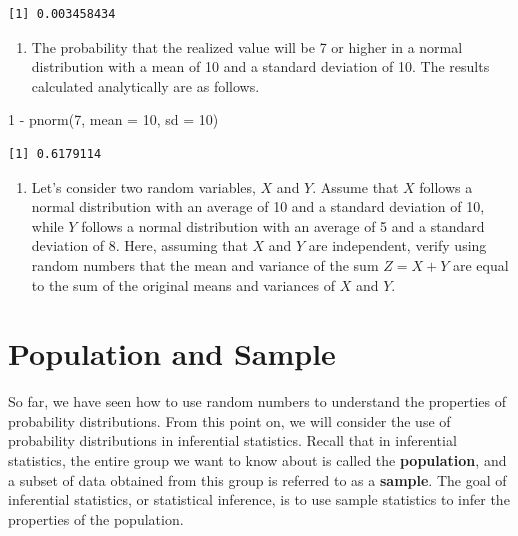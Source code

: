 \documentclass[
  a4paper,
]{book}
\newenvironment{Shaded}{\begin{snugshade}}{\end{snugshade}}
\newcommand{\AttributeTok}[1]{\textcolor[rgb]{0.40,0.45,0.13}{#1}}
\newcommand{\DecValTok}[1]{\textcolor[rgb]{0.68,0.00,0.00}{#1}}
\newcommand{\FunctionTok}[1]{\textcolor[rgb]{0.28,0.35,0.67}{#1}}
\newcommand{\NormalTok}[1]{\textcolor[rgb]{0.00,0.23,0.31}{#1}}
\newcommand{\SpecialCharTok}[1]{\textcolor[rgb]{0.37,0.37,0.37}{#1}}
\providecommand{\tightlist}{%
  \setlength{\itemsep}{0pt}\setlength{\parskip}{0pt}}\usepackage{longtable,booktabs,array}
\begin{document}
\begin{verbatim}
[1] 0.003458434
\end{verbatim}

\begin{enumerate}
\def\labelenumi{\arabic{enumi}.}
\setcounter{enumi}{3}
\tightlist
\item
  The probability that the realized value will be 7 or higher in a
  normal distribution with a mean of 10 and a standard deviation of 10.
  The results calculated analytically are as follows.
\end{enumerate}

\begin{Shaded}
\begin{Highlighting}[]
\DecValTok{1} \SpecialCharTok{{-}} \FunctionTok{pnorm}\NormalTok{(}\DecValTok{7}\NormalTok{, }\AttributeTok{mean =} \DecValTok{10}\NormalTok{, }\AttributeTok{sd =} \DecValTok{10}\NormalTok{)}
\end{Highlighting}
\end{Shaded}

\begin{verbatim}
[1] 0.6179114
\end{verbatim}

\begin{enumerate}
\def\labelenumi{\arabic{enumi}.}
\setcounter{enumi}{4}
\tightlist
\item
  Let's consider two random variables, \(X\) and \(Y\). Assume that
  \(X\) follows a normal distribution with an average of 10 and a
  standard deviation of 10, while \(Y\) follows a normal distribution
  with an average of 5 and a standard deviation of 8. Here, assuming
  that \(X\) and \(Y\) are independent, verify using random numbers that
  the mean and variance of the sum \(Z=X+Y\) are equal to the sum of the
  original means and variances of \(X\) and \(Y\).
\end{enumerate}

\section{Population and Sample}\label{population-and-sample}

So far, we have seen how to use random numbers to understand the
properties of probability distributions. From this point on, we will
consider the use of probability distributions in inferential statistics.
Recall that in inferential statistics, the entire group we want to know
about is called the \textbf{population}, and a subset of data obtained
from this group is referred to as a \textbf{sample}. The goal of
inferential statistics, or statistical inference, is to use sample
statistics to infer the properties of the population.
\end{document}
